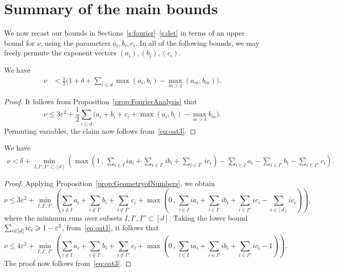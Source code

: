 \section{Summary of the main bounds}

We now recast our bounds in Sections~\ref{s:fourier}--\ref{s:det} in terms of
an upper bound for $\nu$, using
the parameters $a_i,b_i,c_i$.
In all of the following bounds, we may freely permute the exponent vectors $(a_i),(b_i),(c_i)$.

\begin{proposition}\label{prop:FourierBound}
We have
\begin{align*}
\nu & < \frac{1}{2}\Big(1+\delta +\sum_{i\leq d} \max(a_i,b_i) - \max_{m>1}(a_m,b_m)\Big).
\end{align*}
\end{proposition}
\begin{proof}
It follows from Proposition~\ref{prop:FourierAnalysis} that
\[
\nu \leq 3\varepsilon^2+
\frac{1}{2}\sum_{i\leq d}\Big(a_i+b_i+c_i +\max(a_i,b_i) - \max_{m>1}b_m\Big).
\]
Permuting variables, the claim now follows from~\eqref{eq:oat3}.
\end{proof}


\begin{proposition} \label{prop:GeometryBound}
We have
\begin{align*}
\nu < \delta + \min_{I,I',I''\subset [d]} \left(
\max\left( 1 \,,\, \sum_{i\in I} ia_i +\sum_{i\in I'} ib_i + \sum_{i\in I''} ic_i\right) - \sum_{i\in I} a_i -\sum_{i\in I'} b_i - \sum_{i\in I''} c_i\right).
\end{align*}
\end{proposition}
\begin{proof}
Applying Proposition~\ref{prop:GeometryofNumbers}, we obtain
\[
\nu \leq 3\varepsilon^2+
\min_{I,I',I''}
 \left( \sum_{i\notin I} a_i +\sum_{i\notin I'} b_i + \sum_{i\notin I''} c_i +
\max\left( 0 \,,\, \sum_{i\in I} ia_i +\sum_{i\in I'} ib_i + \sum_{i\in I''} ic_i-
\sum_{i\in [d]} ic_i
\right)\right) ,
\]
where the minimum runs over subsets
$I,I',I''\subset[d]$. Taking the lower bound
$\sum_{i\in [d]} ic_i\geqslant 1-\varepsilon^2$,
 from~\eqref{eq:oat1},
 it follows that
\begin{equation}
\nu
\leq 4\varepsilon^2+
\min_{I,I',I''}
 \left( \sum_{i\notin I} a_i +\sum_{i\notin I'} b_i + \sum_{i\notin I''} c_i+
\max\left( 0 \,,\, \sum_{i\in I} ia_i +\sum_{i\in I'} ib_i + \sum_{i\in I''} ic_i-1\right)\right).\label{eq:Geoalt}
\end{equation}
The proof now follows from~\eqref{eq:oat3}.
\end{proof}


